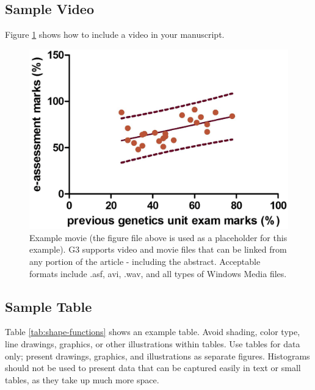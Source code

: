 \documentclass[9pt,twocolumn,twoside]{g3_article/gsag3jnl}
\begin{document}
{\subsection*{Sample Video}

Figure \ref{video:spectrum} shows how to include a video in your manuscript.

\begin{figure}[htbp]
\renewcommand{\familydefault}{\sfdefault}\normalfont
\centering
\includegraphics[width=\linewidth]{images/example-figure-g3}
\caption{Example movie (the figure file above is used as a placeholder for this example). G3 supports video and movie 
         files that can be linked from any portion of the article - including the abstract. Acceptable formats include 
         .asf, avi, .wav, and all types of Windows Media files.   
}%

\label{video:spectrum}
\end{figure}


\subsection*{Sample Table}

Table \ref{tab:shape-functions} shows an example table. Avoid shading, color type, line drawings, graphics, or 
                                other illustrations within tables. Use tables for data only; present drawings, graphics, 
                                and illustrations as separate figures. Histograms should not be used to present data 
                                that can be captured easily in text or small tables, as they take up much more space.  

}
\end{document}
